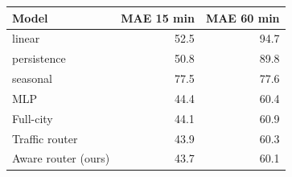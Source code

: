 \begin{tabular}{lrr}
\toprule
Model & MAE 15 min & MAE 60 min \\
\midrule
linear & 52.5 & 94.7 \\
persistence & 50.8 & 89.8 \\
seasonal & 77.5 & 77.6 \\
MLP & 44.4 & 60.4 \\
\midrule
Full-city & 44.1 & 60.9 \\
Traffic router & 43.9 & 60.3 \\
Aware router (ours) & 43.7 & 60.1 \\
\bottomrule
\end{tabular}
